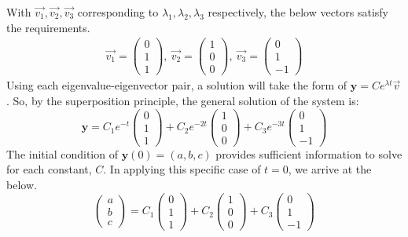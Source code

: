 \documentclass[a4paper]{article}
\begin{document}
With $\vec{v_1}, \vec{v_2}, \vec{v_3}$ corresponding to $\lambda_1, \lambda_2, \lambda_3$ respectively, the below vectors satisfy the requirements.
\begin{align*}
	\vec{v_1} = \begin{pmatrix} 0 \\ 1 \\ 1 \end{pmatrix},\ 
	\vec{v_2} = \begin{pmatrix} 1 \\ 0 \\ 0 \end{pmatrix},\ 
	\vec{v_3} = \begin{pmatrix} 0 \\ 1 \\ -1 \end{pmatrix}
\end{align*}
Using each eigenvalue-eigenvector pair, a solution will take the form of $\mathbf{y} = Ce^{\lambda t}\vec{v}$. So, by the superposition principle, the general solution of the system is:
\begin{equation}
	\mathbf{y} = C_1e^{-t} \begin{pmatrix} 0 \\ 1 \\ 1 \end{pmatrix}
	+ C_2e^{-2t} \begin{pmatrix} 1 \\ 0 \\ 0 \end{pmatrix}
	+ C_3e^{-3t} \begin{pmatrix} 0 \\ 1 \\ -1 \end{pmatrix}
	\label{gen_solution1}
\end{equation}
The initial condition of $\mathbf{y}(0)=(a,b,c)$ provides sufficient information to solve for each constant, $C$. In applying this specific case of $t=0$, we arrive at the below.
\begin{equation}
	\begin{pmatrix} a \\ b \\ c \end{pmatrix} = C_1\begin{pmatrix} 0 \\ 1 \\ 1 \end{pmatrix}
	+ C_2\begin{pmatrix} 1 \\ 0 \\ 0 \end{pmatrix}
	+ C_3\begin{pmatrix} 0 \\ 1 \\ -1 \end{pmatrix}
	\label{solution1_t0}
\end{equation}
\end{document}
